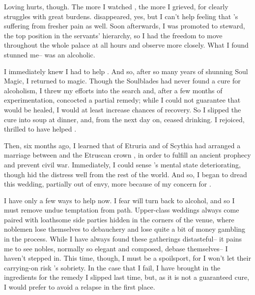 \documentclass[char]{Kos}
\begin{document}
Loving \cBride{\them} hurts, though. The more I watched \cBride{\them}, the more I grieved, for \cBride{\they} clearly struggles with great burdens. \cBride{\Their} \cFugitive{\sibling} disappeared, yes, but I can't help feeling that \cBride{}'s suffering from fresher pain as well. Soon afterwards, I was promoted to steward, the top position in the servants' hierarchy, so I had the freedom to move throughout the whole palace at all hours and observe \cBride{\them} more closely. What I found stunned me-- \cBride{\they} was an alcoholic.

I immediately knew I had to help \cBride{\them}. And so, after so many years of shunning Soul Magic, I returned to magic. Though the Soulblades had never found a cure for alcoholism, I threw my efforts into the search and, after a few months of experimentation, concocted a partial remedy; while I could not guarantee that \cBride{\they} would be healed, I would at least increase \cBride{\their} chances of recovery. So I slipped the cure into \cBride{\their} soup at dinner, and, from the next day on, \cBride{\they} ceased drinking. I rejoiced, thrilled to have helped \cBride{\them}.

Then, six months ago, I learned that \cEtruriaKing{\Monarch} \cEtruriaKing{} of Etruria and \cScythiaKing{\Monarch} \cScythiaKing{} of Scythia had arranged a marriage between \cBride{} and the Etruscan crown \cGroom{\prince} \cGroom{}, in order to fulfill an ancient prophecy and prevent civil war. Immediately, I could sense \cBride{}'s mental state deteriorating, though \cBride{\they} hid the distress well from the rest of the world. And so, I began to dread this wedding, partially out of envy, more because of my concern for \cBride{\them}.

I have only a few ways to help \cBride{\them} now. I fear \cBride{\they} will turn back to alcohol, and so I must remove undue temptation from \cBride{\their} path. Upper-class weddings always come paired with loathsome side parties hidden in the corners of the venue, where noblemen lose themselves to debauchery and lose quite a bit of money gambling in the process. While I have always found these gatherings distasteful-- it pains me to see nobles, normally so elegant and composed, debase themselves-- I haven't stepped in. This time, though, I must be a spoilsport, for I won't let their carrying-on risk \cBride{}'s sobriety. In the case that I fail, I have brought in the ingredients for the remedy I slipped \cBride{\them} last time, but, as it is not a guaranteed cure, I would prefer to avoid a relapse in the first place.
\end{document}
